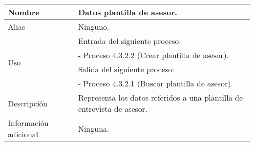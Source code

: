 \begin{center}
  \begin{tabular}{| l | p{9cm} |}
    \hline
    Nombre & \textbf{Datos plantilla de asesor}.\\
    \hline
    Alias & Ninguno.\\
    \hline
    \multirow{4}{*}{Uso} & Entrada del siguiente proceso:\\
                         & - Proceso 4.3.2.2 (Crear plantilla de asesor).\\
                         & Salida del siguiente proceso:\\
                         & - Proceso 4.3.2.1 (Buscar plantilla de asesor).\\
    \hline
    Descripción & Representa los datos referidos a una plantilla de entrevista
                  de asesor.\\
    \hline
    Información adicional & Ninguna.\\
    \hline
  \end{tabular}
\end{center}
